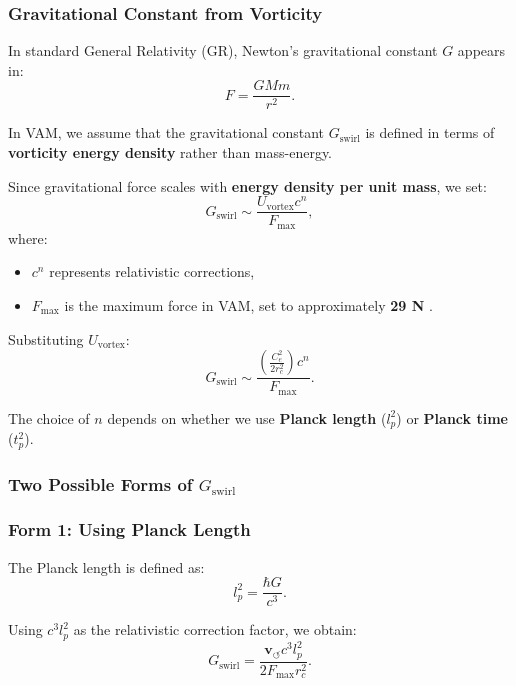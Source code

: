 \subsubsection*{Gravitational Constant from Vorticity}
In standard General Relativity (GR), Newton's gravitational constant \( G \) appears in:
\begin{equation*}
    F = \frac{GMm}{r^2}.
\end{equation*}

In VAM, we assume that the gravitational constant \(  G_\text{swirl} \) is defined in terms of \textbf{vorticity energy density} rather than mass-energy.

Since gravitational force scales with \textbf{energy density per unit mass}, we set:
\begin{equation*}
     G_\text{swirl} \sim \frac{U_\text{vortex} c^n}{F_{\max}},
\end{equation*}
where:
\begin{itemize}
    \item \( c^n \) represents relativistic corrections,
    \item \( F_{\max} \) is the maximum force in VAM, set to approximately \textbf{29 N} \cite{schiller_max_force}.
\end{itemize}

Substituting \( U_\text{vortex} \):
\begin{equation*}
     G_\text{swirl} \sim \frac{\left( \frac{C_e^2}{2 r_c^2} \right) c^n}{F_{\max}}.
\end{equation*}

The choice of \( n \) depends on whether we use \textbf{Planck length} (\( l_p^2 \)) or \textbf{Planck time} (\( t_p^2 \)).

\subsubsection*{Two Possible Forms of \(  G_\text{swirl} \)}
\subsubsection*{Form 1: Using Planck Length}
The Planck length is defined as:
\begin{equation*}
    l_p^2 = \frac{\hbar G}{c^3}.
\end{equation*}

Using \( c^3 l_p^2 \) as the relativistic correction factor, we obtain:
\begin{equation*}
     G_\text{swirl} = \frac{\mathbf{v}_{\scriptscriptstyle\boldsymbol{\circlearrowleft}} c^3 l_p^2}{2 F_{\max} r_c^2}.
\end{equation*}

